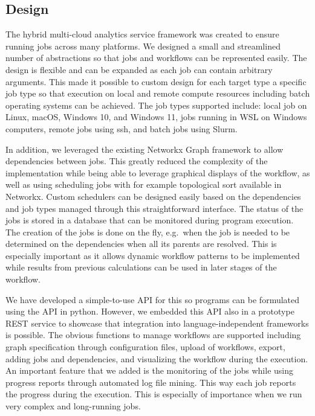 \hypertarget{design}{%
\subsection{Design}\label{design}}

The hybrid multi-cloud analytics service framework was created to ensure
running jobs across many platforms. We designed a small and streamlined
number of abstractions so that jobs and workflows can be represented
easily. The design is flexible and can be expanded as each job can
contain arbitrary arguments. This made it possible to custom design for
each target type a specific job type so that execution on local and
remote compute resources including batch operating systems can be
achieved. The job types supported include: local job on Linux, macOS,
Windows 10, and Windows 11, jobs running in WSL on Windows computers,
remote jobs using ssh, and batch jobs using Slurm.

In addition, we leveraged the existing Networkx Graph framework to allow
dependencies between jobs. This greatly reduced the complexity of the
implementation while being able to leverage graphical displays of the
workflow, as well as using scheduling jobs with for example topological
sort available in Networkx. Custom schedulers can be designed easily
based on the dependencies and job types managed through this
straightforward interface. The status of the jobs is stored in a
database that can be monitored during program execution. The creation of
the jobs is done on the fly, e.g.~when the job is needed to be
determined on the dependencies when all its parents are resolved. This
is especially important as it allows dynamic workflow patterns to be
implemented while results from previous calculations can be used in
later stages of the workflow.

We have developed a simple-to-use API for this so programs can be
formulated using the API in python. However, we embedded this API also
in a prototype REST service to showcase that integration into
language-independent frameworks is possible. The obvious functions to
manage workflows are supported including graph specification through
configuration files, upload of workflows, export, adding jobs and
dependencies, and visualizing the workflow during the execution. An
important feature that we added is the monitoring of the jobs while
using progress reports through automated log file mining. This way each
job reports the progress during the execution. This is especially of
importance when we run very complex and long-running jobs.

